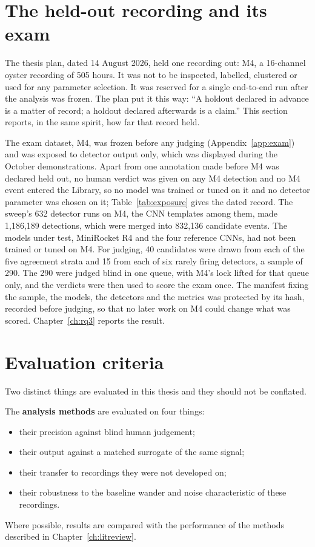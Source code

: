 \section{The held-out recording and its exam}
\label{sec:holdout}

The thesis plan, dated 14 August 2026, held one recording out: M4, a 16-channel oyster recording of 505 hours. It was not to be inspected, labelled, clustered or used for any parameter selection. It was reserved for a single end-to-end run after the analysis was frozen. The plan put it this way: ``A holdout declared in advance is a matter of record; a holdout declared afterwards is a claim.'' This section reports, in the same spirit, how far that record held.

The exam dataset, M4, was frozen before any judging (Appendix~\ref{app:exam}) and was exposed to detector output only, which was displayed during the October demonstrations. Apart from one annotation made before M4 was declared held out, no human verdict was given on any M4 detection and no M4 event entered the Library, so no model was trained or tuned on it and no detector parameter was chosen on it; Table~\ref{tab:exposure} gives the dated record. The sweep's 632 detector runs on M4, the CNN templates among them, made 1,186,189 detections, which were merged into 832,136 candidate events. The models under test, MiniRocket R4 and the four reference CNNs, had not been trained or tuned on M4. For judging, 40 candidates were drawn from each of the five agreement strata and 15 from each of six rarely firing detectors, a sample of 290. The 290 were judged blind in one queue, with M4's lock lifted for that queue only, and the verdicts were then used to score the exam once. The manifest fixing the sample, the models, the detectors and the metrics was protected by its hash, recorded before judging, so that no later work on M4 could change what was scored. Chapter~\ref{ch:rq3} reports the result.

\section{Evaluation criteria}
\label{sec:evaluation}

Two distinct things are evaluated in this thesis and they should not be conflated.

The \textbf{analysis methods} are evaluated on four things:
\begin{itemize}
  \item their precision against blind human judgement;
  \item their output against a matched surrogate of the same signal;
  \item their transfer to recordings they were not developed on;
  \item their robustness to the baseline wander and noise characteristic of these recordings.
\end{itemize}
Where possible, results are compared with the performance of the methods described in Chapter~\ref{ch:litreview}.

